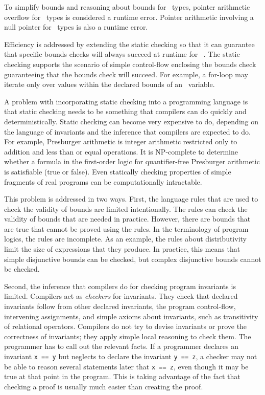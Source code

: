To simplify bounds and reasoning about bounds for
\arrayptr\ types, pointer arithmetic overflow for \arrayptr\
types is considered a runtime error. Pointer arithmetic involving a null
pointer for \arrayptr\ types is also a runtime error.

Efficiency is addressed by extending the static checking so that it can
guarantee that specific bounds checks will always succeed at runtime for
\arrayptr\ . The static checking
supports the scenario of simple control-flow enclosing the bounds check
guaranteeing that the bounds check will succeed. For example, a for-loop
may iterate only over values within the declared bounds of an
\arrayptr\ variable.

A problem with incorporating static checking into a programming language
is that static checking needs to be something that compilers can do
quickly and deterministically. Static checking can become very expensive
to do, depending on the language of invariants and the inference that
compilers are expected to do. For example, Presburger arithmetic is
integer arithmetic restricted only to addition and less than or equal
operations. It is NP-complete to determine whether a formula in the
first-order logic for quantifier-free Presburger arithmetic is
satisfiable (true or false). Even statically checking properties of
simple fragments of real programs can be computationally intractable.

This problem is addressed in two ways. First, the language rules that are
used to check the validity of bounds are limited intentionally.  The rules can
check the validity of bounds that are needed in practice.  However, there are
bounds that are true that cannot be proved using the rules.  In the terminology
of program logics, the rules are incomplete.  As an example, the 
rules about distributivity limit the size of
expressions that they produce.   In practice, this means that 
simple disjunctive bounds can be checked, but complex disjunctive bounds cannot be checked.
 
Second, the inference that compilers do for checking program invariants is
limited.  Compilers act as \emph{checkers} for invariants. They check that
declared invariants follow from other declared invariants, the
program control-flow, intervening assignments, and simple axioms about
invariants, such as transitivity of relational operators. Compilers
do not try to devise invariants or prove the correctness of
invariants; they apply simple local reasoning to check them. The
programmer has to call out the relevant facts. If a programmer declares
an invariant \texttt{x == y} but neglects to declare the invariant
\texttt{y == z}, a checker may not be able to reason several
statements later that \texttt{x == z}, even though it may be true at
that point in the program. This is taking advantage of the fact that
checking a proof is usually much easier than creating the proof.

